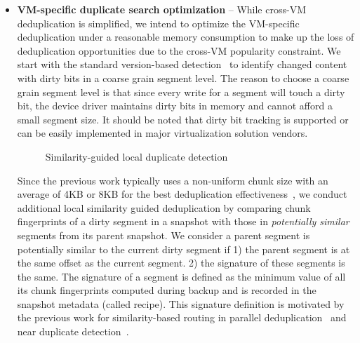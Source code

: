 \begin{itemize}
\item 
\textbf{VM-specific duplicate search optimization} --
While cross-VM deduplication is simplified, we intend to optimize the VM-specific deduplication 
under a reasonable memory consumption
 to make up the loss of deduplication opportunities due to the cross-VM popularity constraint.
We start with the standard version-based detection~\cite{Clements2009,Vrable2009}
to identify changed content with dirty bits in a coarse grain segment level.
The reason to choose a coarse grain segment level is that 
since every write for a segment will touch a dirty bit, the device driver maintains dirty bits in 
memory and cannot afford a small segment size.
It should be noted that dirty bit tracking is supported or can be easily implemented in 
major virtualization solution vendors. 

\begin{figure}[htbp]
  \centering
  \caption{Similarity-guided local duplicate detection}
  \label{fig:local_dedup}
\end{figure}

Since the previous work typically uses a non-uniform chunk size 
with an average of 4KB or 8KB for the best deduplication 
effectiveness~\cite{Guo2011,extreme_binning09,bottleneck08,Dong2011},
we conduct additional local similarity guided deduplication 
by comparing chunk fingerprints of a dirty segment in a snapshot 
with those in  {\em potentially similar} segments from its parent snapshot. 
We consider a parent  segment is  potentially similar to the current dirty segment if 1) the parent segment
is at the same offset as the current segment.
2) the signature of these segments is the same.
The signature of a segment is defined as the minimum value of all its chunk fingerprints 
computed during backup and is recorded in the snapshot metadata (called recipe). 
This signature definition is motivated by the previous work for similarity-based routing in parallel
deduplication~\cite{extreme_binning09,Dong2011} and near duplicate detection~\cite{shingling97}. 




\end{itemize}
